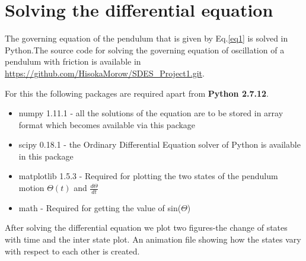 \documentclass[a4paper]{article}
\begin{document}
\section{Solving the differential equation}
The governing equation of the pendulum that is given by Eq.\ref{eq1} is solved in Python.The source code for solving the governing equation of oscillation of a pendulum with friction is available in \url{https://github.com/HisokaMorow/SDES_Project1.git}.

For this the following packages are required 
apart from \textbf{Python 2.7.12}.
\begin{itemize}
    \item{numpy 1.11.1} - all the solutions of the equation are to be stored in array format which becomes available via this package
    \item{scipy 0.18.1} - the Ordinary Differential Equation solver of Python is available in this package
    \item{matplotlib 1.5.3} - Required for plotting the two states of the pendulum motion $\Theta(t)$ and $\frac{d\Theta}{dt}$
    \item{math} - Required for getting the value of sin($\Theta$)
\end{itemize}

After solving the differential equation we plot two figures-the change of states with time and the inter state plot. An animation file showing how the states vary with respect to each other is created.
\end{document}
